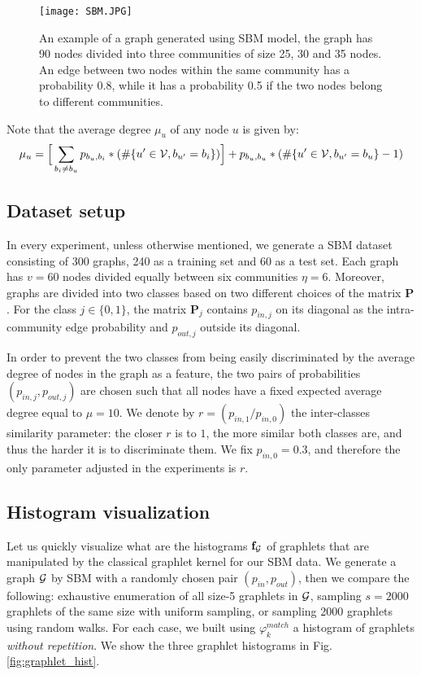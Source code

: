\begin{figure}[H]
\centering
\texttt{[image: SBM.JPG]}
\caption[Visualization of an SBM-based graph example]{An example of a graph generated using SBM model, the graph has 90 nodes divided into three communities of size 25, 30 and 35 nodes. An edge between two nodes within the same community has a probability 0.8, while it has a probability 0.5 if the two nodes belong to different communities.}
\label{fig:SBM_example}
\end{figure}

Note that the average degree $\mu_u$ of any node $u$ is given by:
\begin{equation}
    \mu_u=\Big[\sum_{b_i\neq b_u} p_{b_u,b_i}*(\#\{ u'\in \mathcal{V}, b_{u'}=b_i \} )\Big]+p_{b_u,b_u}*(\#\{u'\in \mathcal{V}, b_{u'}=b_u \}-1 )
\end{equation}

\subsection{Dataset setup}

In every experiment, unless otherwise mentioned, we generate a SBM dataset consisting of 300 graphs, 240 as a training set and 60 as a test set. Each graph has $v=60$ nodes divided equally between six communities $\eta=6$. Moreover, graphs are divided into two classes based on two different choices of the matrix $\mathbf{P}$. For the class $j\in\{0,1\}$, the matrix $\mathbf{P}_j$ contains $p_{in,j}$ on its diagonal as the intra-community edge probability and $p_{out,j}$ outside its diagonal.


In order to prevent the two classes from being easily discriminated by the average degree of nodes in the graph as a feature, the two pairs of probabilities $(p_{in,j}, p_{out,j})$ are chosen such that all nodes have a fixed expected average degree equal to $\mu=10$. We denote by $r=(p_{in,1}/p_{in,0})$ the inter-classes similarity parameter: the closer $r$ is to $1$, the more similar both classes are, and thus the harder it is to discriminate them. We fix $p_{in,0} = 0.3$, and therefore the only parameter adjusted in the experiments is $r$.

\subsection{Histogram visualization}
Let us quickly visualize what are the histograms $\mathbf{f}_{\mathcal{G}}$ of graphlets that are manipulated by the classical graphlet kernel for our SBM data. We generate a graph $\mathcal{G}$ by SBM with a randomly chosen pair $(p_{in},p_{out})$, then we compare the following: exhaustive enumeration of all size-5 graphlets in $\mathcal{G}$, sampling $s=2000$ graphlets of the same size with uniform sampling, or sampling 2000 graphlets using random walks. For each case, we built using $\varphi^{match}_k$ a histogram of graphlets \emph{without repetition}. We show the three graphlet histograms in Fig. \ref{fig:graphlet_hist}. 

